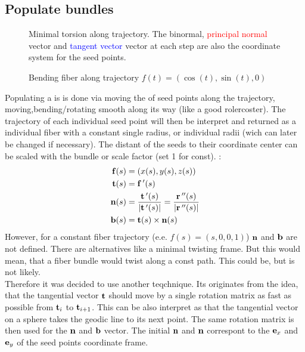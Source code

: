 \subsection{Populate bundles}\label{sec:fillBundle}
% 
\begin{figure}[!t]
    \def\tikzwidth{0.75\textwidth}
    \centering
	\caption[Minimal torsion trajectory]{Minimal torsion along trajectory. The 
	\textcolor{green!50!black}{binormal}, \textcolor{red}{principal normal} vector and \textcolor{blue}{tangent vector} vector at each step are also the coordinate system for the seed points.}
\end{figure}
% 
\begin{figure}[!t]
    \centering
	\caption[]{Bending fiber along trajectory $f(t) = \left( \cos(t), \sin(t), 0 \right)$}
	\label{fig:circleBundle}
\end{figure}
% 
Populating a  is is done via moving the  of seed points along the trajectory, moving,bending/rotating smooth along its way (like a good rolercoster).
The trajectory of each individual seed point will then be interpret and returned as a individual fiber with a constant single radius, or individual radii (wich can later be changed if necessary).
The distant of the seeds to their coordinate center can be scaled with the bundle  or scale factor (set 1 for const). :
% 
\begin{align}
\begin{split}
\mathbf{f}(s) &= (x(s),y(s),z(s)) \\
\mathbf{t}(s) &= \mathbf{f}\,'(s) \\
\mathbf{n}(s) &= \frac{\mathbf{t}\,'(s)}{|\mathbf{t}\,'(s)|} = \frac{\mathbf{r}\,''(s)}{|\mathbf{r}\,''(s)|} \\
\mathbf{b}(s) &= \mathbf{t}(s) \times \mathbf{n}(s)
\end{split}
\end{align}
% 
However, for a constant fiber trajectory (e.e. $f(s) = (s,0,0,1)$) $\mathbf{n}$ and $\mathbf{b}$ are not defined. There are alternatives like a minimal twisting frame. But this would mean, that \eg a fiber bundle would twist along a const path. This could be, but is not likely.
\\
% 
Therefore it was decided to use another teqchnique. Its originates from the idea, that the tangential vector $\mathbf{t}$ should move by a single rotation matrix as fast as possible from $\mathbf{t}_i$ to $\mathbf{t}_{i+1}$. This can be also interpret as that the tangential vector on a sphere takes the geodic line to its next point. The same rotation matrix is then used for the $\mathbf{n}$ and $\mathbf{b}$ vector. The initial $\mathbf{n}$ and $\mathbf{n}$ correspont to the $\mathbf{e}_x$ and $\mathbf{e}_y$ of the seed points coordinate frame.
% 
